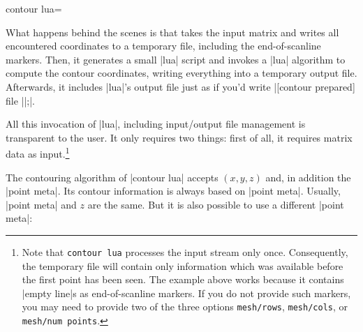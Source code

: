 {{\begin{plottype}[/pgfplots]{
    contour lua=\textcolor{black}{}%
}
\begin{codeexample}[]
\end{codeexample}
    \noindent What happens behind the scenes is that \PGFPlots{} takes the
    input matrix and writes all encountered coordinates to a temporary file,
    including the end-of-scanline markers. Then, it generates a small |lua|
    script and invokes a |lua| algorithm to compute the contour coordinates, writing
    everything into a temporary output file. Afterwards, it includes
    |lua|'s output file just as if you'd write
    |[contour prepared] file ||;|.

    All this invocation of |lua|, including input/output file management is
    transparent to the user. It only requires two things: first of all, it
    requires matrix data as input.\footnote{Note that \texttt{contour lua}
    processes the input stream only once. Consequently, the temporary file will
    contain only information which was available before the first point has
    been seen. The example above works because it contains |empty line|s as
    end-of-scanline markers. If you do not provide such markers, you may need
    to provide two of the three options \texttt{mesh/rows}, \texttt{mesh/cols},
    or \texttt{mesh/num points}.} 
	
    The contouring algorithm of |contour lua| accepts $(x,y,z)$ and, in addition the |point meta|. Its contour information is always based on |point meta|. Usually, |point meta| and $z$ are the same. But it is also possible to use a different |point meta|:

\begin{codeexample}[]
\end{codeexample}
\end{plottype}}}
